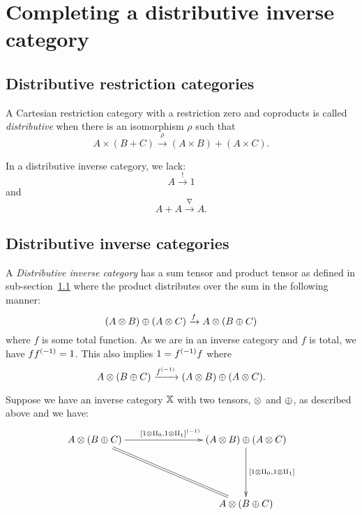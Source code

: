 
\section{Completing a distributive inverse category} %
\label{sec:completing_a_distributive_inverse_category}
\subsection{Distributive restriction categories} %
\label{sub:distributive_restriction_categories}


\begin{definition}
  A Cartesian restriction category with a restriction zero and coproducts is called
  \emph{distributive} when there is an isomorphism $\rho$ such that
  \[
    A\times (B+C) \xrightarrow{\rho} (A\times B) +(A\times C).
  \]
\end{definition}

In a distributive inverse category, we lack:
\[
  A  \xrightarrow{!} 1
\]
and
\[
  A+A \xrightarrow{\nabla} A.
\]

\subsection{Distributive inverse categories} %
\label{sub:distributive_inverse_categories}


A \emph{Distributive inverse category} has a sum tensor and product tensor as defined in
sub-section~\ref{sub:distributive_restriction_categories} where the product distributes over the sum
in the following manner:
\[
  (A\otimes B) \oplus (A \otimes C) \xrightarrow{f} A \otimes (B \oplus C)
\]
where $f$ is some total function. As we are in an inverse category and $f$ is total, we have $f
{f}^{(-1)} = 1$. This also implies $1 = {f}^{(-1)} f$ where
\[
  A \otimes (B \oplus C) \xrightarrow{{f}^{(-1)}}(A\otimes B) \oplus (A \otimes C).
\]

Suppose we have an inverse category $\mathbb{X}$ with two tensors, $\otimes$ and $\oplus$, as described above and we
have:
\[
  \xymatrix @C=80pt @R=50pt{
    A \* (B \+ C) \ar[r]^{\inv{[1\* \cpa, 1\* \cpb]}} \ar@{=}[dr]
    & (A\* B) \+ (A \* C) \ar[d]^{[1\* \cpa, 1\* \cpb]} \\
    &A \* (B \+ C)
  }
\]

